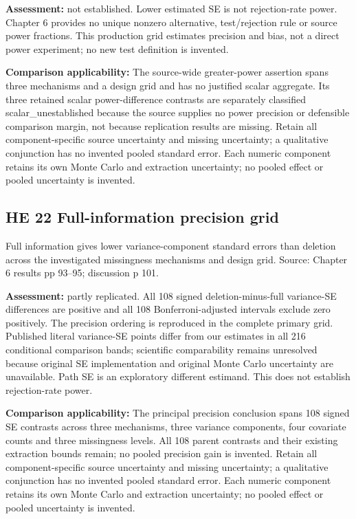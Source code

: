 \documentclass[11pt]{article}
\begin{document}
\textbf{Assessment:} not established. Lower estimated SE is not rejection-rate power. Chapter 6 provides no unique nonzero alternative, test/rejection rule or source power fractions. This production grid estimates precision and bias, not a direct power experiment; no new test definition is invented.

\textbf{Comparison applicability:} The source-wide greater-power assertion spans three mechanisms and a design grid and has no justified scalar aggregate. Its three retained scalar power-difference contrasts are separately classified scalar\_unestablished because the source supplies no power precision or defensible comparison margin, not because replication results are missing. Retain all component-specific source uncertainty and missing uncertainty; a qualitative conjunction has no invented pooled standard error. Each numeric component retains its own Monte Carlo and extraction uncertainty; no pooled effect or pooled uncertainty is invented.
\subsection{HE 22 Full-information precision grid}\label{head:HE22}
Full information gives lower variance-component standard errors than deletion across the investigated missingness mechanisms and design grid. Source: Chapter 6 results pp 93--95; discussion p 101.

\textbf{Assessment:} partly replicated. All 108 signed deletion-minus-full variance-SE differences are positive and all 108 Bonferroni-adjusted intervals exclude zero positively. The precision ordering is reproduced in the complete primary grid. Published literal variance-SE points differ from our estimates in all 216 conditional comparison bands; scientific comparability remains unresolved because original SE implementation and original Monte Carlo uncertainty are unavailable. Path SE is an exploratory different estimand. This does not establish rejection-rate power.

\textbf{Comparison applicability:} The principal precision conclusion spans 108 signed SE contrasts across three mechanisms, three variance components, four covariate counts and three missingness levels. All 108 parent contrasts and their existing extraction bounds remain; no pooled precision gain is invented. Retain all component-specific source uncertainty and missing uncertainty; a qualitative conjunction has no invented pooled standard error. Each numeric component retains its own Monte Carlo and extraction uncertainty; no pooled effect or pooled uncertainty is invented.
\end{document}
